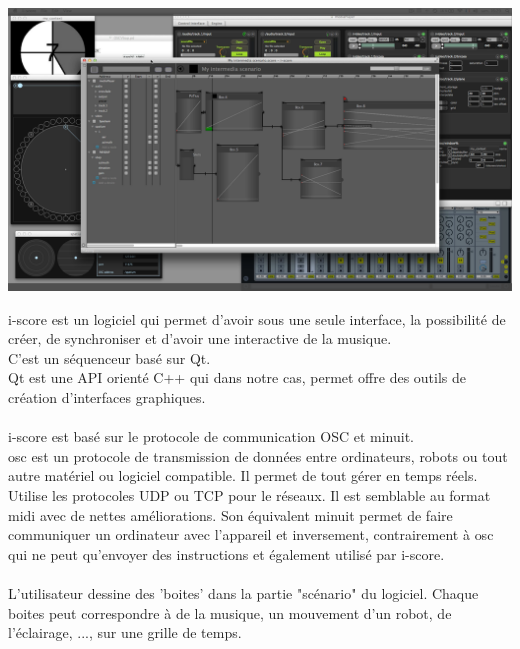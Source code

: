 \documentclass[10pt,a4paper]{report}
\begin{document}
\paragraph{}

\begin{center}
\includegraphics[scale=0.1]{image/iscore.jpg}
\end{center}

i-score est un logiciel qui permet d'avoir sous une seule interface, la possibilité de créer, de synchroniser et d'avoir une interactive de la musique.
\\
C'est un séquenceur basé sur Qt.\\
Qt est une API orienté C++ qui dans notre cas, permet offre des outils de création d'interfaces graphiques.
\paragraph{}
i-score est basé sur le protocole de communication OSC et minuit.
\\
\acrfull{osc} est un protocole de transmission de données entre ordinateurs, robots ou tout autre matériel ou logiciel compatible. Il permet de tout gérer en temps réels. Utilise les protocoles UDP ou TCP pour le réseaux. Il est semblable au format \acrfull{midi} avec de nettes améliorations. Son équivalent minuit permet de faire communiquer un ordinateur avec l'appareil et inversement, contrairement à \acrshort{osc} qui ne peut qu'envoyer des instructions et également utilisé par i-score.
\paragraph{}
L'utilisateur dessine des 'boites' dans la partie "scénario" du logiciel. Chaque boites peut correspondre à de la musique, un mouvement d'un robot, de l'éclairage, ..., sur une grille de temps.
\end{document}
